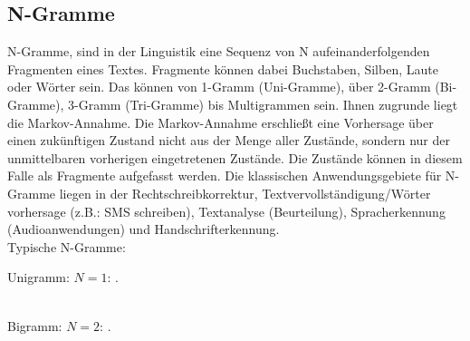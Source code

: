 \documentclass[12pt]{article}
\begin{document}
\subsection{N-Gramme}
N-Gramme, sind in der Linguistik eine Sequenz von N aufeinanderfolgenden Fragmenten eines Textes.
Fragmente können dabei Buchstaben, Silben, Laute oder Wörter sein. Das können von 1-Gramm (Uni-Gramme),
über 2-Gramm (Bi-Gramme), 3-Gramm (Tri-Gramme) bis Multigrammen sein. Ihnen zugrunde liegt die Markov-Annahme.
Die Markov-Annahme\cite{scheffervanck2019} erschließt eine Vorhersage über einen zukünftigen Zustand nicht aus der Menge aller
Zustände, sondern nur der unmittelbaren vorherigen eingetretenen Zustände. Die Zustände können in diesem
Falle als Fragmente aufgefasst werden. Die klassischen Anwendungsgebiete für N-Gramme liegen in der
Rechtschreibkorrektur, Textvervollständigung/Wörter vorhersage (z.B.: SMS schreiben), Textanalyse
(Beurteilung), Spracherkennung (Audioanwendungen) und Handschrifterkennung.\\

\noindent Typische N-Gramme:

Unigramm:
$N = 1$: 	
.
\\[0.5cm]

Bigramm:
$N = 2$: 	
\hspace{-0.6cm}
\hspace{-0.6cm}.
\\[0.5cm]
\end{document}
